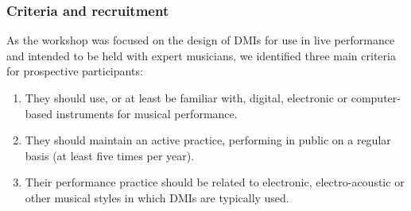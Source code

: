 \documentclass[letterpaper, 12pt]{article}
\begin{document}

\subsubsection{Criteria and recruitment}
\label{ch3-sec:criteria-and-recruitment}

As the workshop was focused on the design of DMIs for use in live performance and intended to be held with expert musicians, we identified three main criteria for prospective participants:

\begin{enumerate}[noitemsep]
    \item They should use, or at least be familiar with, digital, electronic or computer-based instruments for musical performance.
    \item They should maintain an active practice, performing in public on a regular basis (at least five times per year). 
    \item Their performance practice should be related to electronic, electro-acoustic or other musical styles in which DMIs are typically used.
\end{enumerate}
\end{document}
